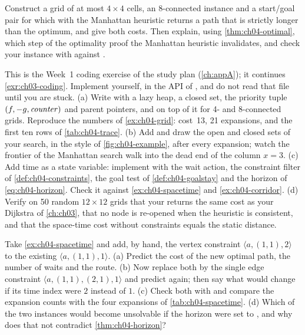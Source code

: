\begin{exercise}[\difficulty{2}]
\label{exr:ch04-manhattan8}
Construct a grid of at most $4 \times 4$ cells, an 8-connected instance and a
start/goal pair for which \astar with the Manhattan heuristic returns a path
that is strictly longer than the optimum, and give both costs. Then explain,
using \cref{thm:ch04-optimal}, which step of the optimality proof the Manhattan
heuristic invalidates, and check your instance with
 against
.
\end{exercise}

\begin{exercise}
\label{exr:ch04-coding}
This is the Week~1 coding exercise of the study plan (\cref{ch:appA}); it
continues \cref{exr:ch03-coding}. Implement \astar yourself, in the API of
, and do not read that file until you are stuck.
(a) Write  with a lazy heap, a
closed set, the priority tuple $(f, -g, \mathit{counter})$ and parent
pointers, and  on top of it for 4- and 8-connected grids.
Reproduce the numbers of \cref{ex:ch04-grid}: cost~13, 21 expansions, and the
first ten rows of \cref{tab:ch04-trace}. (b) Add  and
draw the open and closed sets of your search, in the style of
\cref{fig:ch04-example}, after every expansion; watch the frontier of the
Manhattan search walk into the dead end of the column $x = 3$. (c) Add time as
a state variable: implement  with the wait action, the constraint filter of
\cref{def:ch04-constraints}, the goal test of \cref{def:ch04-goalstay} and the
horizon of \cref{eq:ch04-horizon}. Check it against \cref{ex:ch04-spacetime} and
\cref{ex:ch04-corridor}. (d) Verify on 50 random $12 \times 12$ grids that your
\astar returns the same cost as your Dijkstra of \cref{ch:ch03}, that no node is
re-opened when the heuristic is consistent, and that the space-time cost without
constraints equals the static distance.
\end{exercise}

\begin{exercise}[\difficulty{3}]
\label{exr:ch04-spacetime}
Take \cref{ex:ch04-spacetime} and add, by hand, the vertex constraint
$\langle a, (1,1), 2\rangle$ to the existing $\langle a, (1,1), 1\rangle$.
(a) Predict the cost of the new optimal path, the number of waits and the route.
(b) Now replace both by the single edge constraint
$\langle a, (1,1), (2,1), 1\rangle$ and predict again; then say what would
change if its time index were $2$ instead of $1$. (c) Check both with
 and compare the expansion counts with the four
expansions of \cref{tab:ch04-spacetime}. (d) Which of the two instances would
become unsolvable if the horizon were set to , and why does
that not contradict \cref{thm:ch04-horizon}?
\end{exercise}

